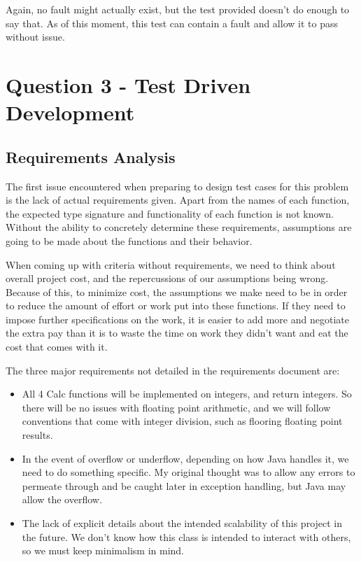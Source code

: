 \documentclass{article}
\begin{document}
Again, no fault might actually exist, but the test provided doesn't do
enough to say that. As of this moment, this test can contain a fault
and allow it to pass without issue.

\section{Question 3 - Test Driven Development}

\subsection{Requirements Analysis}

The first issue encountered when preparing to design test cases for this problem is the lack of actual requirements given. Apart from the names of each function, the expected type signature and functionality of each function is not known. Without the ability to concretely determine these requirements, assumptions are going to be made about the functions and their behavior.

When coming up with criteria without requirements, we need to think about overall project cost, and the repercussions of our assumptions being wrong. Because of this, to minimize cost, the assumptions we make need to be in order to reduce the amount of effort or work put into these functions. If they need to impose further specifications on the work, it is easier to add more and negotiate the extra pay than it is to waste the time on work they didn't want and eat the cost that comes with it.

The three major requirements not detailed in the requirements document are:

\begin{itemize}
    \item All 4 Calc functions will be implemented on integers, and return integers. So there will be no issues with floating point arithmetic, and we will follow conventions that come with integer division, such as flooring floating point results.
    \item In the event of overflow or underflow, depending on how Java handles it, we need to do something specific. My original thought was to allow any errors to permeate through and be caught later in exception handling, but Java may allow the overflow.
    \item The lack of explicit details about the intended scalability of this project in the future. We don't know how this class is intended to interact with others, so we must keep minimalism in mind.
\end{itemize}
\end{document}
